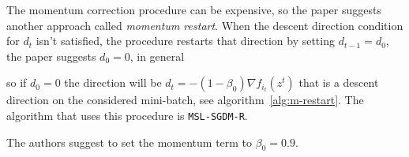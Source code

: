 The momentum correction procedure can be expensive, so the paper suggests another approach called \emph{momentum restart}. When the descent direction condition for $d_t$ isn't satisfied, the procedure restarts that direction by setting $d_{t-1}=d_0$, the paper suggests $d_0=0$, in general
%
\begin{center}
\end{center}
%
so if $d_0=0$ the direction will be $d_t=-(1-\beta_0)\nabla f_{i_t}(z^t)$ that is a descent direction on the considered mini-batch, see algorithm~\vref{alg:m-restart}. The algorithm that uses this procedure is \texttt{MSL-SGDM-R}.

The authors suggest to set the momentum term to $\beta_0=0.9$.

